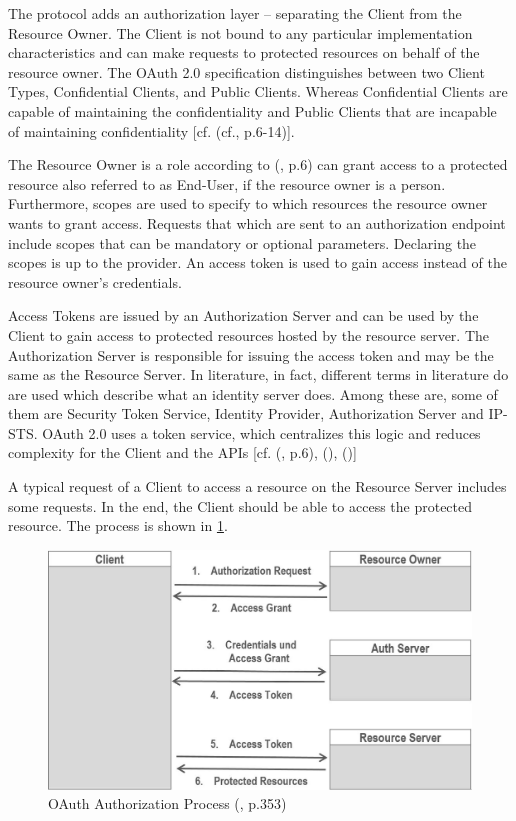 {{{	The protocol adds an authorization layer – separating the Client from the Resource Owner. 
	The Client is not bound to any particular implementation characteristics and can make requests to protected resources on behalf of the resource owner. The OAuth 2.0 specification distinguishes between two Client Types, Confidential Clients, and Public Clients. Whereas Confidential Clients are capable of maintaining the confidentiality and Public Clients that are incapable of maintaining confidentiality [cf. (cf.\cite{Hardt:2012:OAuth2}, p.6-14)].
	
	The Resource Owner is a role according to (\cite{Sakimura:2014:OpenIDConnect}, p.6) can grant access to a protected resource also referred to as End-User, if the resource owner is a person. Furthermore, scopes are used to specify to which resources the resource owner wants to grant access. Requests that which are sent to an authorization endpoint include scopes that can be mandatory or optional parameters. Declaring the scopes is up to the provider. An access token is used to gain access instead of the resource owner’s credentials. 
	
	Access Tokens are issued by an Authorization Server and can be used by the Client to gain access to protected resources hosted by the resource server. The Authorization Server is responsible for issuing the access token and may be the same as the Resource Server. In literature, in fact,  different terms in literature do are used which describe what an identity server does. Among these are, some of them are Security Token Service, Identity Provider, Authorization Server and IP-STS. OAuth 2.0 uses a token service, which centralizes this logic and reduces complexity for the Client and the APIs [cf. (\cite{Sakimura:2014:OpenIDConnect}, p.6), (\cite{Brock:2018:ID4}), (\cite{Boyd:2012:GSOAuth})]
	
	A typical request of a Client to access a resource on the Resource Server includes some requests. In the end, the Client should be able to access the protected resource. The process is shown in \ref{fig:oaut-process2}.
	
	\begin{figure}[h]
		\centering
		\includegraphics[width=0.8\linewidth]{images/oaut-process2}
		\caption{OAuth Authorization Process (\cite{LeBlanc:2011:SocialApplications}, p.353)}
		\label{fig:oaut-process2}
	\end{figure}
	
}}}
